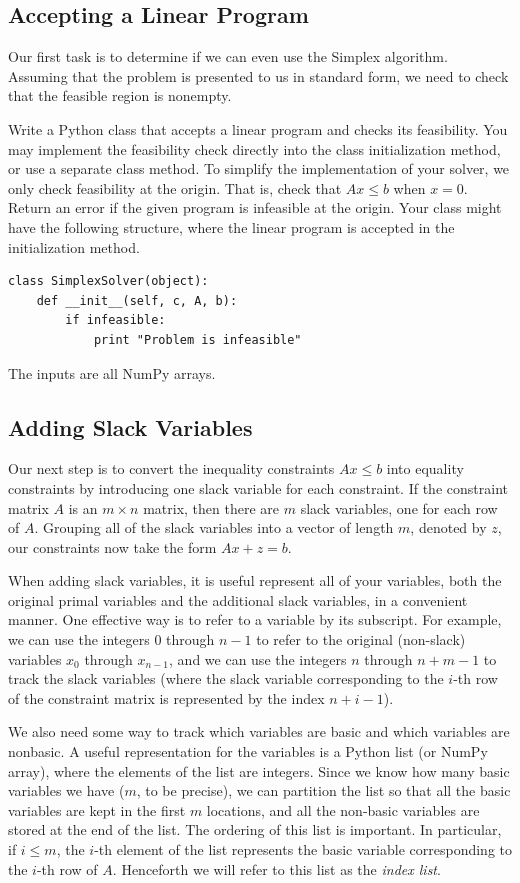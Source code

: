 \subsection{Accepting a Linear Program}
Our first task is to determine if we can even use the Simplex algorithm.
Assuming that the problem is presented to us in standard form, we need
to check that the feasible region is nonempty.

\begin{problem}
Write a Python class that accepts a linear program and checks its feasibility.
You may implement the feasibility check directly into the class initialization method, or use a separate class method.
To simplify the implementation of your solver, we only check feasibility at the origin.
That is, check that $Ax \leq b$ when $x = 0$.
Return an error if the given program is infeasible at the origin.
Your class might have the following structure, where the linear program is accepted in the initialization method.
\begin{lstlisting}
class SimplexSolver(object):
    def __init__(self, c, A, b):
        if infeasible:
            print "Problem is infeasible"
\end{lstlisting}
\label{prob:initsolver}
\end{problem}
The inputs  are all NumPy arrays.
\subsection{Adding Slack Variables}
Our next step is to convert the inequality constraints $Ax \leq b$ into equality constraints
by introducing one slack variable for each constraint.
If the constraint matrix $A$ is an $m \times n$ matrix, then there are $m$ slack variables,
one for each row of $A$.
Grouping all of the slack variables into a vector of length $m$, denoted by $z$, our
constraints now take the form $Ax + z = b$.

When adding slack variables, it is useful represent all of your variables, both the original primal variables and
the additional slack variables, in a convenient manner.
One effective way is to refer to a variable by its subscript.
For example, we can use the integers $0$ through $n-1$ to refer to the original (non-slack) variables $x_0$ through
$x_{n-1}$, and we can use the integers $n$ through $n+m-1$ to track the slack variables (where the slack variable
corresponding to the $i$-th row of the constraint matrix is represented by the index $n+i-1$).

We also need some way to track which variables are basic and which variables are nonbasic.
A useful representation for the variables is a Python list (or NumPy array), where the elements of the list are integers.
Since we know how many basic variables we have ($m$, to be precise), we can partition the list so that all the basic
variables are kept in the first $m$ locations, and all the non-basic variables are stored at the end of the list.
The ordering of this list is important. In particular, if $i \leq m$, the $i$-th element of the list represents
the basic variable corresponding to the $i$-th row of $A$. Henceforth we will refer to this list as the \emph{index list}.

